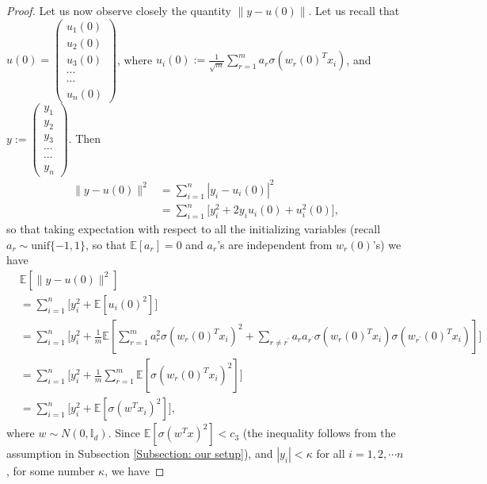 \documentclass[a4paper,11pt]{amsart}
\newcommand{\IE}{\mathbb{E}}
\theoremstyle{definition}
\theoremstyle{plain}
\theoremstyle{remark}
\begin{document}
\begin{proof}
Let us now observe closely the quantity $\|y-u(0)\|$. Let us recall that $u(0)=\begin{pmatrix}
u_1(0)\\u_2(0)\\u_3(0)\\\cdots\\\cdots\\u_n(0)                                                                                
                                                                               \end{pmatrix}
$, where $u_i(0):=\frac{1}{\sqrt{m}}\sum_{r=1}^ma_r\sigma(w_r(0)^Tx_i)$, and $y:=\begin{pmatrix}
                                                 y_1\\y_2\\y_3\\\cdots\\\cdots\\y_n                                   
                                                                                   \end{pmatrix}
$. Then 
\begin{equation*}
\begin{split}
\|y-u(0)\|^2&=\sum_{i=1}^n|y_i-u_i(0)|^2\\
&=\sum_{i=1}^n\Big[y_i^2+2y_iu_i(0)+u_i^2(0)\Big],
\end{split}
\end{equation*}
so that taking expectation with respect to all the initializing variables (recall $a_r\sim\text{unif}\{-1,1\}$, so that $\IE[a_r]=0$ and $a_r$'s are independent from $w_r(0)$'s) we have
\begin{equation*}
\begin{split}
&\IE[\|y-u(0)\|^2]\\
&=\sum_{i=1}^n\Big[y_i^2+\IE[u_i(0)^2]\Big]\\
&=\sum_{i=1}^n\Big[y_i^2+\frac{1}{m}\IE[\sum_{r=1}^m a_r^2\sigma(w_r(0)^Tx_i)^2+\sum_{r\neq r^\prime}a_ra_{r^\prime}\sigma(w_r(0)^Tx_i)\sigma(w_{r^\prime}(0)^Tx_i)]\Big]\\
&=\sum_{i=1}^n\Big[y_i^2+\frac{1}{m}\sum_{r=1}^m \IE[\sigma(w_r(0)^Tx_i)^2]\Big]\\
&=\sum_{i=1}^n\Big[y_i^2+\IE[\sigma(w^Tx_i)^2]\Big],
\end{split}
\end{equation*}
where $w\sim N(0,\mathbb{I}_d)$. Since $\IE[\sigma(w^Tx)^2]<c_3$ (the inequality follows from the assumption in Subsection \ref{Subsection: our setup}), and $|y_i|<\kappa$ for all $i=1,2,\cdots n$, for some number $\kappa$, we have 

\end{proof}
\end{document}
